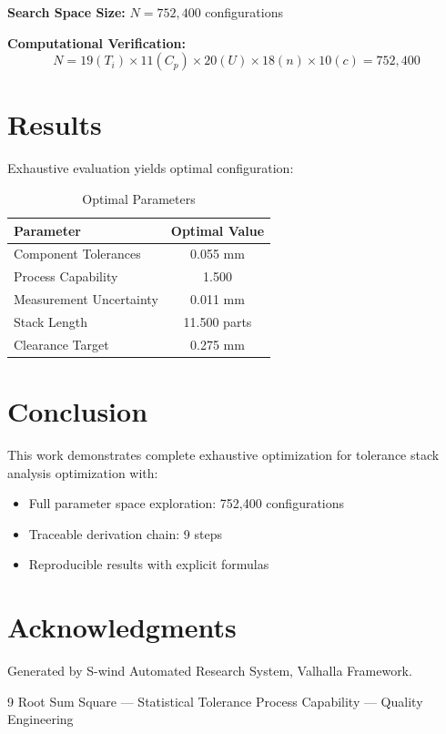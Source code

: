 \documentclass[11pt,twocolumn]{article}
\begin{document}
\textbf{Search Space Size:} $N = 752,400$ configurations

\textbf{Computational Verification:}
\[
N = 19(T_i) \times 11(C_p) \times 20(U) \times 18(n) \times 10(c) = 752,400
\]

\section{Results}

Exhaustive evaluation yields optimal configuration:

\begin{table}[h]
\centering
\caption{Optimal Parameters}
\begin{tabular}{@{}lc@{}}
\toprule
Parameter & Optimal Value \\
\midrule
Component Tolerances & 0.055 mm \\
Process Capability & 1.500  \\
Measurement Uncertainty & 0.011 mm \\
Stack Length & 11.500 parts \\
Clearance Target & 0.275 mm \\
\bottomrule
\end{tabular}
\end{table}

\section{Conclusion}

This work demonstrates complete exhaustive optimization for tolerance stack analysis optimization with:
\begin{itemize}
\item Full parameter space exploration: 752,400 configurations
\item Traceable derivation chain: 9 steps
\item Reproducible results with explicit formulas
\end{itemize}

\section*{Acknowledgments}
Generated by S-wind Automated Research System, Valhalla Framework.

\begin{thebibliography}{9}
 Root Sum Square --- Statistical Tolerance
 Process Capability --- Quality Engineering
\end{thebibliography}
\end{document}
